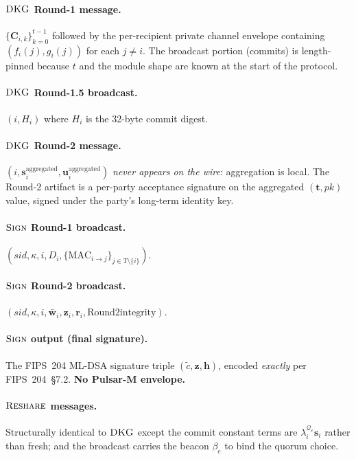 \documentclass[11pt,a4paper]{article}
\theoremstyle{definition}
\theoremstyle{remark}
\newcommand{\Sign}{\textsc{Sign}}
\newcommand{\DKG}{\textsc{DKG}}
\newcommand{\Reshare}{\textsc{Reshare}}
\begin{document}
\paragraph{$\DKG$ Round-1 message.}
\(\{\mathbf{C}_{i,k}\}_{k=0}^{t-1}\) followed by the per-recipient
private channel envelope containing $(f_i(j), g_i(j))$ for each
$j \ne i$. The broadcast portion (commits) is length-pinned because
$t$ and the module shape are known at the start of the protocol.

\paragraph{$\DKG$ Round-1.5 broadcast.}
$(i, H_i)$ where $H_i$ is the 32-byte commit digest.

\paragraph{$\DKG$ Round-2 message.}
$(i, \mathbf{s}_i^{\mathrm{aggregated}}, \mathbf{u}_i^{\mathrm{aggregated}})$
\emph{never appears on the wire}: aggregation is local. The Round-2
artifact is a per-party acceptance signature on the aggregated
$(\mathbf{t}, \mathit{pk})$ value, signed under the party's long-term
identity key.

\paragraph{$\Sign$ Round-1 broadcast.}
$(\mathit{sid}, \kappa, i, D_i, \{\mathrm{MAC}_{i \to j}\}_{j \in T \setminus \{i\}})$.

\paragraph{$\Sign$ Round-2 broadcast.}
$(\mathit{sid}, \kappa, i, \bar{\mathbf{w}}_i, \mathbf{z}_i, \mathbf{r}_i, \text{Round2integrity})$.

\paragraph{$\Sign$ output (final signature).}
The FIPS~204 ML-DSA signature triple $(\tilde c, \mathbf{z}, \mathbf{h})$,
encoded \emph{exactly} per FIPS~204~\S7.2. \textbf{No Pulsar-M envelope.}

\paragraph{$\Reshare$ messages.}
Structurally identical to $\DKG$ except the commit constant terms
are $\lambda_i^{\mathcal{Q}_e} \mathbf{s}_i$ rather than fresh; and the
broadcast carries the beacon $\beta_e$ to bind the quorum choice.
\end{document}
